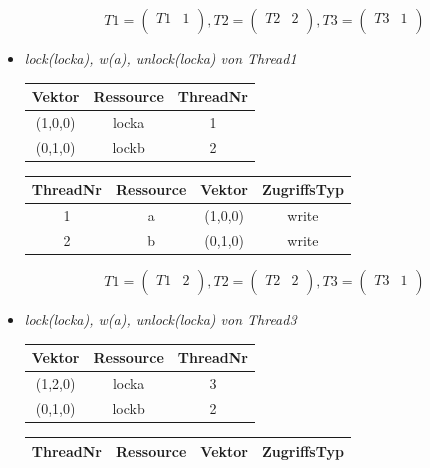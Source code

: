 \documentclass[10pt,a4paper]{article}
\begin{document}
\begin{flushleft}
\begin{itemize}
\[
	T1 = \begin{pmatrix}
		T1 & 1\\
	\end{pmatrix}
	, T2 = \begin{pmatrix}
		T2 & 2\\
	\end{pmatrix}
	, T3 = \begin{pmatrix}
		T3 & 1\\
	\end{pmatrix}
\]
\item \textit{lock(locka), w(a), unlock(locka) von Thread1}\\[0.3cm]
\begin{tabular}{ c c c }
  	Vektor & Ressource & ThreadNr \\\hline
  	(1,0,0) & locka & 1 \\
  	(0,1,0) & lockb & 2 \\\hline
\end{tabular}\hspace*{0.5cm}
\begin{tabular}{ c c c c }
  	ThreadNr & Ressource & Vektor & ZugriffsTyp \\\hline
  	1 & a & (1,0,0) & write \\
  	2 & b & (0,1,0) & write \\\hline
\end{tabular}
\[
	T1 = \begin{pmatrix}
		T1 & 2\\
	\end{pmatrix}
	, T2 = \begin{pmatrix}
		T2 & 2\\
	\end{pmatrix}
	, T3 = \begin{pmatrix}
		T3 & 1\\
	\end{pmatrix}
\]
\item \textit{lock(locka), w(a), unlock(locka) von Thread3}\\[0.3cm]
\begin{tabular}{ c c c }
  	Vektor & Ressource & ThreadNr \\\hline
  	(1,2,0) & locka & 3 \\
  	(0,1,0) & lockb & 2 \\\hline
\end{tabular}\hspace*{0.5cm}
\begin{tabular}{ c c c c }
  	ThreadNr & Ressource & Vektor & ZugriffsTyp \\\hline

\end{tabular}
\end{itemize}
\end{flushleft}
\end{document}
